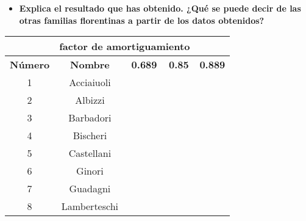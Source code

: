 \newpage 
\begin{ejer}
    \begin{itemize}
        \item \textbf{Explica el resultado que has obtenido. ¿Qué se puede decir de las otras familias florentinas a partir de los datos obtenidos?}
    \end{itemize}
\end{ejer}
\begin{center}
\begin{tabular}{|c|c|c|c|c|}
    \hline
    \rowcolor{azul} \multicolumn{2}{|c|}{\textbf{Familia}}&\multicolumn{3}{c|}{\textbf{factor de amortiguamiento}} \\ \hline
    \rowcolor{azul} \textbf{Número} & \textbf{Nombre} & \textbf{0.689} & \textbf{0.85} & \textbf{0.889} \\ \hline
    1 & Acciaiuoli & \cellcolor{orange!25}{0.035479330884659266} & \cellcolor{orange!25}{0.030616772148504806} & \cellcolor{orange!25}{0.029570860773009678} \\ \hline
    2 & Albizzi & \cellcolor{blue!25}{0.07716802121188286} & \cellcolor{blue!25}{0.07626307878565806} & \cellcolor{blue!25}{0.0754079780067131} \\ \hline
    3 & Barbadori & \cellcolor{yellow!25}{0.051931088549229475} & \cellcolor{yellow!25}{0.05150657580871245} & \cellcolor{yellow!25}{0.05158376088937878} \\ \hline
    4 & Bischeri & \cellcolor{violet!25}{0.06922543274019202} & \cellcolor{violet!25}{0.07070219766081234} & \cellcolor{violet!25}{0.07079660905958886} \\ \hline
    5 & Castellani & \cellcolor{blue!25}{0.07163319737839043} & \cellcolor{blue!25}{0.0737287188007328} & \cellcolor{blue!25}{0.07428425236120793} \\ \hline
    6 & Ginori & \cellcolor{orange!25}{0.03803511605255818} & \cellcolor{orange!25}{0.031508862421612535} & \cellcolor{orange!25}{0.029691539730023933} \\ \hline
    7 & Guadagni & \cellcolor{blue!25}{0.08988386279832349} & \cellcolor{blue!25}{0.08877069919427012} & \cellcolor{blue!25}{0.08747508847562997} \\ \hline
    8 & Lamberteschi & \cellcolor{orange!25}{0.03579468921457365} & \cellcolor{orange!25}{0.02876476367779198} & \cellcolor{orange!25}{0.026786980661079315} \\ \hline

\end{tabular}
\end{center}
